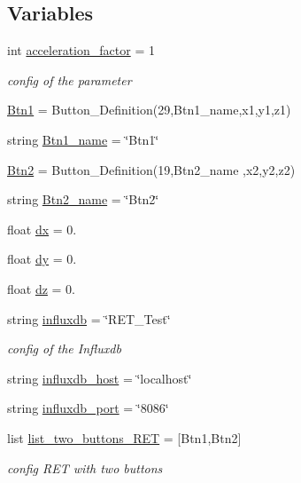 \subsection*{Variables}
\begin{DoxyCompactItemize}
\item 
int \hyperlink{a00025_ac77790b4dfdf11c2ae7b5b9505ff0bd3}{acceleration\+\_\+factor} = 1
\begin{DoxyCompactList}\small\item\em config of the parameter \end{DoxyCompactList}\item 
\hyperlink{a00025_af037c6b9ff0314103d8127acc9d07e0b}{Btn1} = Button\+\_\+\+Definition(29,Btn1\+\_\+name,x1,y1,z1)
\item 
string \hyperlink{a00025_a96d98afcb35718dbc4c13c5bf74cfd5b}{Btn1\+\_\+name} = \char`\"{}Btn1\char`\"{}
\item 
\hyperlink{a00025_a73afa8c52cebd94e1889df5fbe3bec66}{Btn2} = Button\+\_\+\+Definition(19,Btn2\+\_\+name ,x2,y2,z2)
\item 
string \hyperlink{a00025_a9595d49d1fc79cce5a3f3af42cf8502a}{Btn2\+\_\+name} = \char`\"{}Btn2\char`\"{}
\item 
float \hyperlink{a00025_a9eae6c1f38db98ab568f3ed3771a969d}{dx} = 0.
\item 
float \hyperlink{a00025_a8f461b6142ce8725218813abb23b06a3}{dy} = 0.
\item 
float \hyperlink{a00025_a31755dd9c32708851ef90978cd814b35}{dz} = 0.
\item 
string \hyperlink{a00025_a6297da7d9cbabcbe91effb0271677ff3}{influxdb} = \char`\"{}R\+E\+T\+\_\+\+Test\char`\"{}
\begin{DoxyCompactList}\small\item\em config of the Influxdb \end{DoxyCompactList}\item 
string \hyperlink{a00025_a5ad590543d5ae7b0a89b3681d33928d8}{influxdb\+\_\+host} = \char`\"{}localhost\char`\"{}
\item 
string \hyperlink{a00025_a91cab5b28cd6867b74e2cb9f887b2948}{influxdb\+\_\+port} = \char`\"{}8086\char`\"{}
\item 
list \hyperlink{a00025_aceb7d96541943b4a77c54516a2be88d2}{list\+\_\+two\+\_\+buttons\+\_\+\+R\+ET} = \mbox{[}Btn1,Btn2\mbox{]}
\begin{DoxyCompactList}\small\item\em config R\+ET with two buttons \end{DoxyCompactList}\item 

\end{DoxyCompactItemize}
